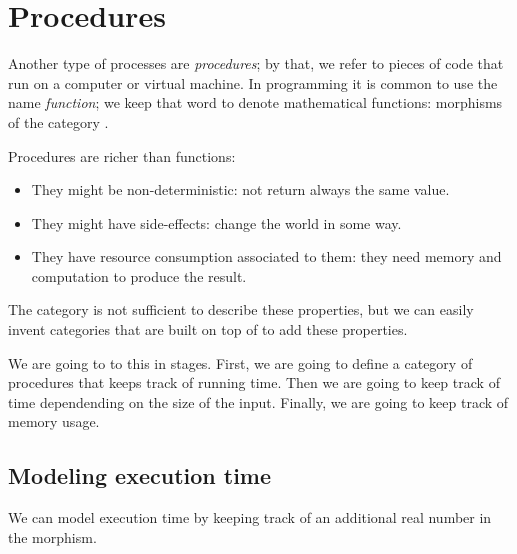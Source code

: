 
\section{Procedures}


Another type of processes are \emph{procedures}; by that, we refer to pieces of code that run on a computer or virtual machine.
In programming it is common to use the name \emph{function}; we keep that word to denote mathematical functions: morphisms of the category \Set.

Procedures are richer than functions:
\begin{itemize}
    \item They might be non-deterministic: not return always the same value.
    \item They might have side-effects: change the world in some way.
    \item They have resource consumption associated to them: they need memory and computation to produce the result.
\end{itemize}

The category \Set is not sufficient to describe these properties, but we can easily invent categories that are built on top of \Set to add these properties.

We are going to to this in stages.
First, we are going to define a category of procedures that keeps track of running time.
Then we are going to keep track of time dependending on the size of the input.
Finally, we are going to keep track of memory usage.

\subsection{Modeling execution time}



We can model execution time by keeping track of an additional real number in the morphism.

